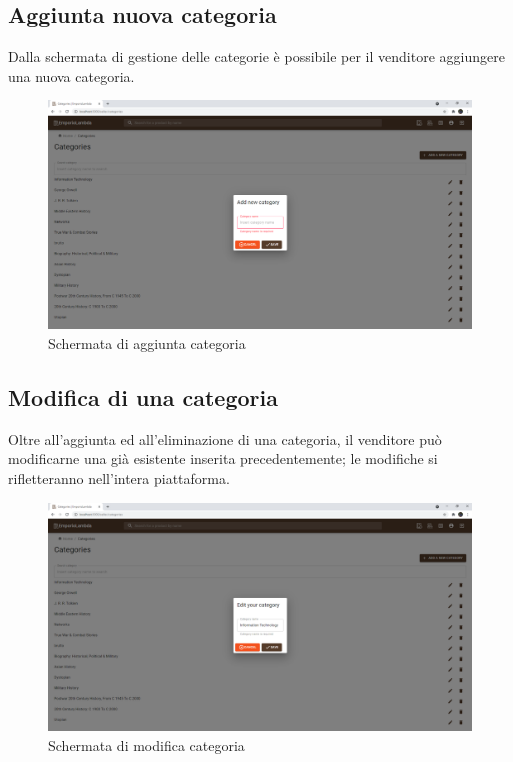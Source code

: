 \subsection{Aggiunta nuova categoria}
Dalla schermata di gestione delle categorie è possibile per il venditore aggiungere una nuova categoria.
\begin{figure}[H]
	\centering
	\includegraphics[scale=0.35]{Immagini/Venditore/Add Category.png}
	\caption{Schermata di aggiunta categoria}
	\label{fig:AggiuntaCategoria}
\end{figure}
\subsection{Modifica di una categoria}
Oltre all'aggiunta ed all'eliminazione di una categoria, il venditore può modificarne una già esistente inserita precedentemente; le modifiche si rifletteranno nell'intera piattaforma.
\begin{figure}[H]
	\centering
	\includegraphics[scale=0.35]{Immagini/Venditore/edit Category.png}
	\caption{Schermata di modifica categoria}
	\label{fig:ModificaCategoria}
\end{figure}